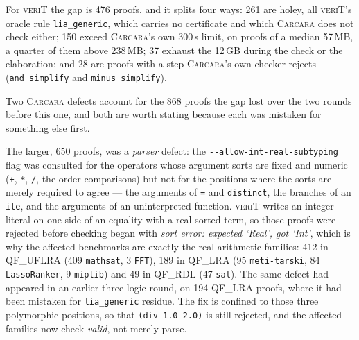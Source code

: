 \documentclass[runningheads]{llncs}
\newcommand{\carcara}{\textsc{Carcara}\xspace}
\newcommand{\verit}{\textsc{veriT}\xspace}
\newcommand{\rulename}[1]{\texttt{#1}}
\begin{document}
For \verit the gap is 476 proofs, and it splits four ways: 261 are holey, all
\verit's oracle rule \rulename{lia\_generic}, which carries no certificate and
which \carcara does not check either; 150 exceed \carcara's own 300\,s limit,
on proofs of a median 57\,MB, a quarter of them above 238\,MB; 37 exhaust the
12\,GB during the check or the elaboration; and 28 are proofs with a step
\carcara's own checker rejects (\rulename{and\_simplify} and
\rulename{minus\_simplify}).

Two \carcara defects account for the 868 proofs the gap lost over the two
rounds before this one, and both are worth stating because each was mistaken for something
else first.

The larger, 650 proofs, was a \emph{parser} defect: the
\texttt{-{}-allow-int-\allowbreak real-\allowbreak subtyping} flag was
consulted for the operators
whose argument sorts are fixed and numeric (\texttt{+}, \texttt{*},
\texttt{/}, the order comparisons) but not for the positions where the sorts
are merely required to agree --- the arguments of \texttt{=} and
\texttt{distinct}, the branches of an \texttt{ite}, and the arguments of an
uninterpreted function. \verit writes an integer literal on one side of an
equality with a real-sorted term, so those proofs were rejected before
checking began with \emph{sort error: expected `Real', got `Int'}, which is
why the affected benchmarks are exactly the real-arithmetic families: 412 in
QF\_UFLRA (409 \texttt{mathsat}, 3 \texttt{FFT}), 189 in QF\_LRA (95
\texttt{meti-tarski}, 84 \texttt{LassoRanker}, 9 \texttt{miplib}) and 49 in
QF\_RDL (47 \texttt{sal}). The same defect had
appeared in an earlier three-logic round, on 194 QF\_LRA proofs, where it had
been mistaken for \rulename{lia\_generic} residue. The fix is confined
to those three polymorphic positions, so that \texttt{(div 1.0 2.0)} is still
rejected, and the affected families now check \emph{valid}, not merely parse.
\end{document}
